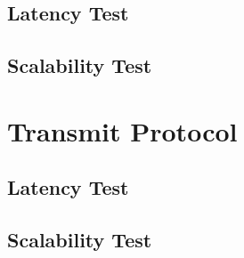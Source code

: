 \subsection{Latency Test}
\subsection{Scalability Test}
\section{Transmit Protocol}
\subsection{Latency Test}
\subsection{Scalability Test}
